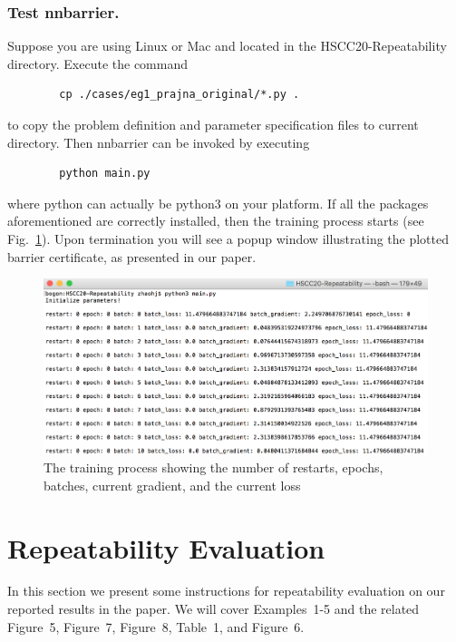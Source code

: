 \documentclass{llncs}
\begin{document}
\subsubsection{Test \textsf{nnbarrier}.} Suppose you are using Linux or Mac and located in the \textsf{HSCC20-Repeatability} directory. Execute the command
\begin{verbatim}              
        cp ./cases/eg1_prajna_original/*.py .
\end{verbatim}
to copy the problem definition and parameter specification files to current directory. Then \textsf{nnbarrier} can be invoked by executing
\begin{verbatim}              
        python main.py
\end{verbatim}
where \textsf{python} can actually be \textsf{python3} on your platform. If all the packages aforementioned are correctly 
installed, then the training process starts (see Fig.~\ref{fig:train-process}). Upon termination you will see a popup window illustrating the plotted barrier certificate,
as presented in our paper.
\begin{figure}[t]
    \includegraphics[width=\textwidth]{./fig/training-process}
    \caption{The training process showing the number of restarts, epochs, batches, current gradient, and the current loss} \label{fig:train-process}
\end{figure}

\section{Repeatability Evaluation}
In this section we present some instructions for repeatability evaluation on our reported results in the paper. We will cover Examples~1-5 and 
the related Figure~5, Figure~7, Figure~8, Table~1, and Figure~6.
\end{document}
